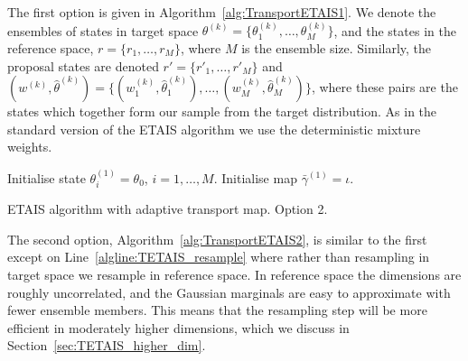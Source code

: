 \documentclass[final]{siamltex}
\begin{document}
The first option is given in Algorithm~\ref{alg:TransportETAIS1}. We
denote the ensembles of states in target space $\theta^{(k)} =
\{\theta^{(k)}_1,\dots,\theta^{(k)}_M\}$, and the states in the
reference space, $r = \{r_1,\dots,r_M\}$, where $M$ is the ensemble
size. Similarly, the proposal states are denoted $r' =
\{r'_1,\dots,r'_M\}$ and $(w^{(k)}, \hat{\theta}^{(k)}) =
\{(w^{(k)}_1, \hat{\theta}^{(k)}_1),\dots,(w^{(k)}_M,
\hat{\theta}^{(k)}_M)\}$, where these pairs are the states which
together form our sample from the target distribution. As in the standard version of the ETAIS algorithm we use the deterministic mixture weights.

\begin{table}
\begin{algorithm}[H]
\DontPrintSemicolon
\BlankLine
Initialise state $\theta^{(1)}_i = \theta_0$, \quad $i = 1,\dots,M$.\;
Initialise map $\bar{\gamma}^{(1)} = \iota$.\;
\caption{ETAIS algorithm with adaptive transport map. Option 2.\label{alg:TransportETAIS2}}
\end{algorithm}
\end{table}

The second option, Algorithm~\ref{alg:TransportETAIS2}, is similar to
the first except on Line~\ref{algline:TETAIS_resample} where rather
than resampling in target space we resample in reference space. In
reference space the dimensions are roughly uncorrelated, and the
Gaussian marginals are easy to approximate with fewer ensemble
members. This means that the resampling step will be more efficient in
moderately higher dimensions, which we discuss in Section~\ref{sec:TETAIS_higher_dim}.
\end{document}

